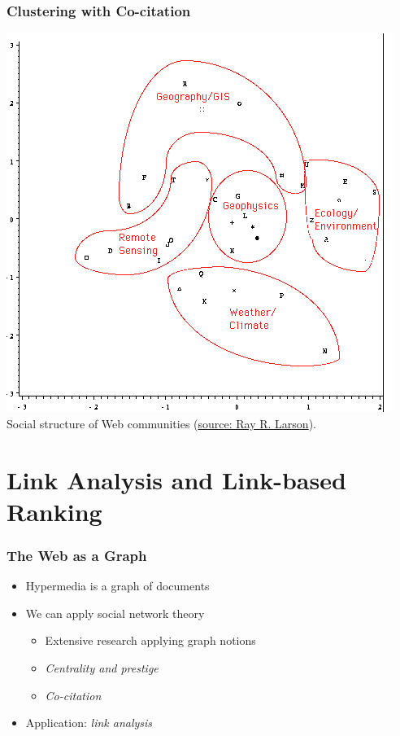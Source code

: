\documentclass{beamer}
\begin{document}

\begin{frame}
  \frametitle{Clustering with Co-citation}

  \centering
  \includegraphics[width=.7\linewidth]{cocit}\\
  \tiny Social structure of Web communities
  (\href{https://sherlock.ischool.berkeley.edu/asis96/asis96.html}{source: Ray
    R. Larson}).

\end{frame}


\section{Link Analysis and Link-based Ranking}

\begin{frame}
  \frametitle{The Web as a Graph}

  \begin{itemize}
  \item Hypermedia is a graph of documents
  \item We can apply social network theory
      \begin{itemize}
      \item Extensive research applying graph notions
      \item \emph{Centrality and prestige}
      \item \emph{Co-citation}
      \end{itemize}
  \item Application: \emph{link analysis}
  \end{itemize}

\end{frame}
\end{document}
